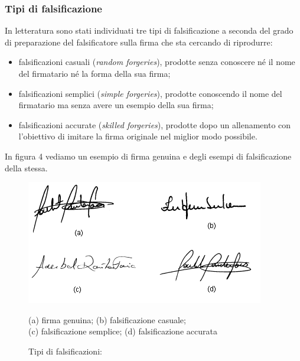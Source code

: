 \subsubsection{Tipi di falsificazione}
\label{2.1.2}
In letteratura sono stati individuati tre tipi di falsificazione a seconda del grado di preparazione del falsificatore sulla firma che sta cercando di riprodurre:
\begin{itemize}
\item falsificazioni casuali (\emph{random forgeries}), prodotte senza conoscere né il nome del firmatario né la forma della sua firma;
\item falsificazioni semplici (\emph{simple forgeries}), prodotte conoscendo il nome del firmatario ma senza avere un esempio della sua firma;
\item falsificazioni accurate (\emph{skilled forgeries}), prodotte dopo un allenamento con l'obiettivo di imitare la firma originale nel miglior modo possibile.
\end{itemize}
In figura 4 vediamo un esempio di firma genuina e degli esempi di falsificazione della stessa.
\begin{figure}[H]
\centering
\includegraphics[scale=1.0]{../Logo&Header/esempiForged.png}
\caption{Tipi di falsificazioni:} (a) firma genuina; (b) falsificazione casuale;\\
(c) falsificazione semplice; (d) falsificazione accurata
\end{figure}

